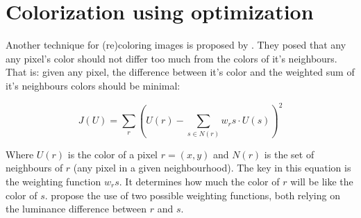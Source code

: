 \section{Colorization using optimization}
	
	Another technique for (re)coloring images is proposed by \citet{levin2004colorization}.
	They posed that any any pixel's color should not differ too much from the colors of it's 
	neighbours.
	That is: given any pixel, the difference between it's color and the weighted sum of it's
	neighbours colors should be minimal:

	\begin{equation}
		J(U) = \sum_r \left ( U(r) - \sum_{s \in N(r)} w_rs \cdot U(s) \right )^2
	\end{equation}

	Where $U(r)$ is the color of a pixel $r = (x,y)$ and $N(r)$ is the set of neighbours of $r$ 
	(any pixel in a given neighbourhood).
	The key in this equation is the weighting function $w_rs$.
	It determines how much the color of $r$ will be like the color of $s$.
	\citet{levin2004colorization} propose the use of two possible weighting functions,
	both relying on the luminance difference between $r$ and $s$.
	
